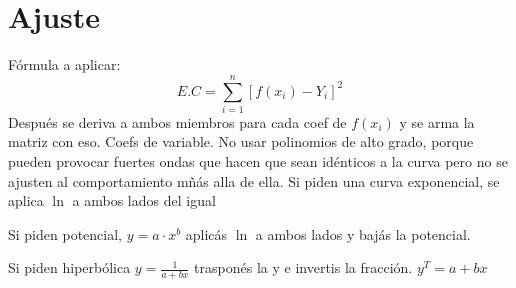 \section{Ajuste}
Fórmula a aplicar:
$$E.C=\sum_{i=1}^{n}\left[f(x_i)-Y_i\right]^2$$
Después se deriva a ambos miembros para cada coef de $f(x_i)$ y se arma la matriz con eso.
Coefs de variable.
No usar polinomios de alto grado, porque pueden provocar fuertes ondas que hacen que sean idénticos
a la curva pero no se ajusten al comportamiento mñás alla de ella.
Si piden una curva exponencial, se aplica $\ln$ a ambos lados del igual

Si piden potencial, $y=a\cdot x ^b$ aplicás $\ln$ a ambos lados y bajás la potencial.

Si piden hiperbólica $y=\frac{1}{a+bx}$ trasponés la y e invertis la fracción.
 $y^T=a+bx$